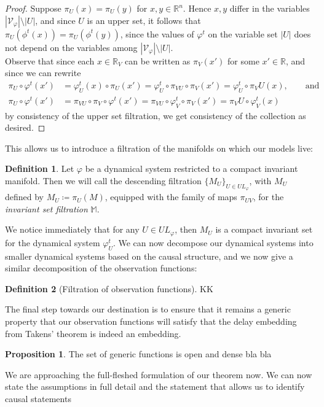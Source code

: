 \documentclass[11pt, a4paper]{memoir}
\theoremstyle{plain}
\theoremstyle{definition}
\newtheorem{defn}{Definition}
\newtheorem{prop}{Proposition}
\newcommand{\mR}{\mathbb{R}}
\begin{document}
\begin{proof}
Suppose $\pi_U(x)=\pi_U(y)$ for $x,y\in \mR^n$. Hence $x,y$ differ in the variables $|\mathcal{V}_\varphi|\setminus |U|$, and since $U$ is an upper set, it follows that $\pi_U(\phi^t(x))=\pi_U(\phi^t(y))$, since the values of $\varphi^t$ on the variable set $|U|$ does not depend on the variables  among $|\mathcal{V}_\varphi|\setminus |U|$.\\
Observe that since each $x\in \mR_V$ can be written as $\pi_V(x')$ for some $x'\in \mR$, and since we can rewrite
\begin{align*}
\pi_U\circ\varphi^t(x')
&=\varphi_U^t(x)\circ\pi_U(x')=
\varphi_U^t\circ\pi_{VU}\circ\pi_V(x')=\varphi_U^t\circ\pi_VU(x),\quad\quad \text{and}\\
\pi_U\circ\varphi^t(x')&=\pi_{VU}\circ \pi_V\circ\varphi^t(x')=\pi_{VU}\circ \varphi_V^t\circ \pi_V(x')=\pi_VU\circ\varphi_V^t(x)
\end{align*}
by consistency of the upper set filtration, we get consistency of the collection as desired.
\end{proof}
This allows us to introduce a filtration of the manifolds on which our models live:
\begin{defn}
Let $\varphi$ be a dynamical system restricted to a compact invariant manifold. Then we will call the descending filtration $\{M_U\}_{U\in UL_\varphi}$, with $M_U$ defined by $M_U\coloneqq \pi_U(M)$, equipped with the family of maps $\pi_{UV}$, for the \emph{invariant set filtration} $\mathbb{M}$.
\end{defn}
We notice immediately that for any $U\in UL_\varphi$, then $M_U$ is a compact invariant set for the dynamical system $\varphi^t_U$. We can now decompose our dynamical systems into smaller dynamical systems based on the causal structure, and we now give a similar decomposition of the observation functions:
\begin{defn}[Filtration of observation functions]
KK
\end{defn}
The final step towards our destination is to ensure that it remains a generic property that our observation functions will satisfy that the delay embedding from Takens' theorem is indeed an embedding.
\begin{prop}
The set of generic functions is open and dense bla bla
\end{prop}
We are approaching the full-fleshed formulation of our theorem now. We can now state the assumptions in full detail and the statement that allows us to identify causal statements
\end{document}
